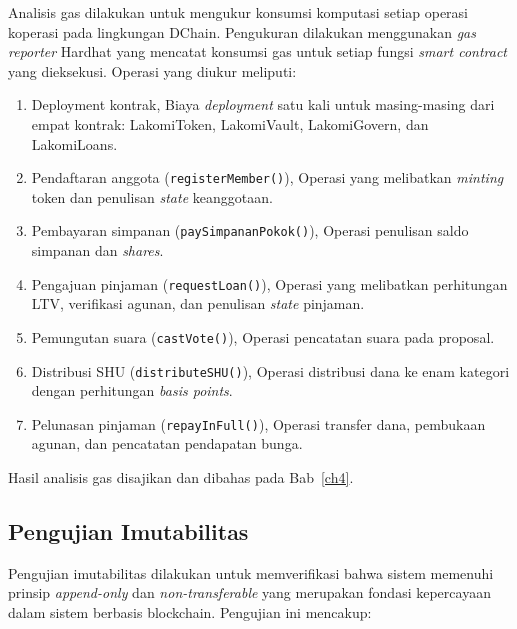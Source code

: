 Analisis gas dilakukan untuk mengukur konsumsi komputasi setiap operasi koperasi pada lingkungan DChain. Pengukuran dilakukan menggunakan \textit{gas reporter} Hardhat yang mencatat konsumsi gas untuk setiap fungsi \textit{smart contract} yang dieksekusi. Operasi yang diukur meliputi:

\begin{enumerate}
	\item Deployment kontrak, Biaya \textit{deployment} satu kali untuk masing-masing dari empat kontrak: LakomiToken, LakomiVault, LakomiGovern, dan LakomiLoans.
	\item Pendaftaran anggota (\texttt{registerMember()}), Operasi yang melibatkan \textit{minting} token dan penulisan \textit{state} keanggotaan.
	\item Pembayaran simpanan (\texttt{paySimpananPokok()}), Operasi penulisan saldo simpanan dan \textit{shares}.
	\item Pengajuan pinjaman (\texttt{requestLoan()}), Operasi yang melibatkan perhitungan LTV, verifikasi agunan, dan penulisan \textit{state} pinjaman.
	\item Pemungutan suara (\texttt{castVote()}), Operasi pencatatan suara pada proposal.
	\item Distribusi SHU (\texttt{distributeSHU()}), Operasi distribusi dana ke enam kategori dengan perhitungan \textit{basis points}.
	\item Pelunasan pinjaman (\texttt{repayInFull()}), Operasi transfer dana, pembukaan agunan, dan pencatatan pendapatan bunga.
\end{enumerate}

Hasil analisis gas disajikan dan dibahas pada Bab~\ref{ch4}.

\subsection{Pengujian Imutabilitas}

Pengujian imutabilitas dilakukan untuk memverifikasi bahwa sistem memenuhi prinsip \textit{append-only} dan \textit{non-transferable} yang merupakan fondasi kepercayaan dalam sistem berbasis blockchain. Pengujian ini mencakup:


